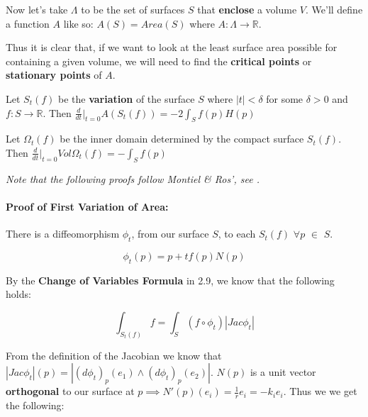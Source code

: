 \documentclass[a4paper,12pt]{report}
\begin{document}
\hspace{-0.66cm}Now let's take $\Lambda$ to be the set of surfaces $S$ that \textbf{enclose} a volume $V$. We'll define a function $A$ like so: $A(S) = Area(S)$ where $A: \Lambda \rightarrow \mathbb{R}$.\par 
Thus it is clear that, if we want to look at the least surface area possible for containing a given volume, we will need to find the \textbf{critical points} or \textbf{stationary points} of $A$. 

\begin{theorem}
Let $S_{t}(f)$ be the \textbf{variation} of the surface $S$ where $|t| < \delta$ for some $\delta > 0$ and $f: S \rightarrow \mathbb{R}$. Then $\frac{d}{dt}\bigg|_{t=0} A(S_{t}(f)) = -2 \int_{S} f(p)H(p)$
\end{theorem}

\begin{theorem}
Let $\Omega_{t}(f)$ be the inner domain determined by the compact surface $S_{t}(f)$. Then $\frac{d}{dt}\bigg|_{t=0} Vol\Omega_{t}(f) = - \int_{S} f(p)
$ 
\end{theorem}

\textit{Note that the following proofs follow Montiel \& Ros', see \cite{montiel}.}

\paragraph{Proof of First Variation of Area:}

There is a diffeomorphism $\phi_{t}$, from our surface $S$, to each $S_{t}(f)$ $\forall p$ $\in$ $S$. 

\begin{equation}
\phi_{t}(p) = p + tf(p)N(p)
\end{equation}

By the \textbf{Change of Variables Formula} in 2.9, we know that the following holds:

\begin{equation}
\int_{S_{t}(f)} f = \int_{S} (f \circ \phi_{t})|Jac \phi_{t}|
\end{equation}

From the definition of the Jacobian we know that $|Jac \phi_{t}| (p) = |(d\phi_{t})_{p} (e_{1}) \wedge (d\phi_{t})_{p} (e_{2}) |$. $N(p)$ is a unit vector \textbf{orthogonal} to our surface at $p \implies N'(p)(e_{i}) = \frac{1}{r}e_{i} = -k_{i}e_{i}$. Thus we we get the following:
\end{document}

